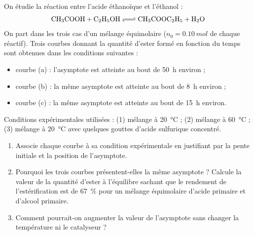 \documentclass[11pt]{article}
\newcounter{popsec}
\newcounter{popsub}
\newcommand{\courssub}[1]{%
  \stepcounter{popsub}%
  \par\vspace{9pt}\noindent{\popxbold\fontsize{11.5}{13}\selectfont\color{popink}{\color{poporange}\thepopsec.\thepopsub}\hspace{6pt}#1}\par\nopagebreak\vspace{4pt}
}
\begin{document}
\begin{exercice}
On étudie la réaction entre l'acide éthanoïque et l'éthanol :
\[ \ce{CH3COOH + C2H5OH <=> CH3COOC2H5 + H2O} \]
On part dans les trois cas d'un mélange équimolaire ($n_0 = \SI{0,10}{mol}$ de chaque réactif). Trois courbes donnant la quantité d'ester formé en fonction du temps sont obtenues dans les conditions suivantes :
\begin{itemize}
\item courbe (a) : l'asymptote est atteinte au bout de \SI{50}{h} environ ;
\item courbe (b) : la même asymptote est atteinte au bout de \SI{8}{h} environ ;
\item courbe (c) : la même asymptote est atteinte au bout de \SI{15}{h} environ.
\end{itemize}
Conditions expérimentales utilisées : (1) mélange à \SI{20}{\celsius} ; (2) mélange à \SI{60}{\celsius} ; (3) mélange à \SI{20}{\celsius} avec quelques gouttes d'acide sulfurique concentré.
\begin{enumerate}
\item Associe chaque courbe à sa condition expérimentale en justifiant par la pente initiale et la position de l'asymptote.
\item Pourquoi les trois courbes présentent-elles la même asymptote ? Calcule la valeur de la quantité d'ester à l'équilibre sachant que le rendement de l'estérification est de \SI{67}{\%} pour un mélange équimolaire d'acide primaire et d'alcool primaire.
\item Comment pourrait-on augmenter la valeur de l'asymptote sans changer la température ni le catalyseur ?
\end{enumerate}
\end{exercice}

\courssub{Je me prépare au Bac}
\end{document}
